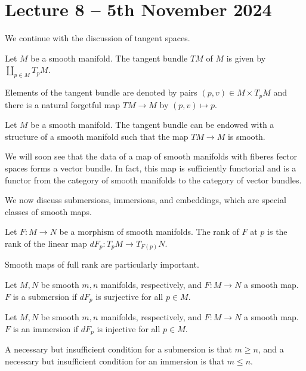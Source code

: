 \section{Lecture 8 -- 5th November 2024}\label{sec: lecture 8}
We continue with the discussion of tangent spaces. 
\begin{definition}\label{def: tangent bundle}
    Let $M$ be a smooth manifold. The tangent bundle $TM$ of $M$ is given by $\coprod_{p\in M}T_{p}M$. 
\end{definition}
\begin{remark}
    Elements of the tangent bundle are denoted by pairs $(p,v)\in M\times T_{p}M$ and there is a natural forgetful map $TM\to M$ by $(p,v)\mapsto p$. 
\end{remark}
\begin{proposition}\label{prop: tangent bundle is smooth manifold}
    Let $M$ be a smooth manifold. The tangent bundle can be endowed with a structure of a smooth manifold such that the map $TM\to M$ is smooth. 
\end{proposition}
\begin{remark}
    We will soon see that the data of a map of smooth manifolds with fiberes fector spaces forms a vector bundle. In fact, this map is sufficiently functorial and is a functor from the category of smooth manifolds to the category of vector bundles. 
\end{remark}
We now discuss submersions, immersions, and embeddings, which are special classes of smooth maps. 
\begin{definition}\label{def: rank of smooth map}
    Let $F:M\to N$ be a morphism of smooth manifolds. The rank of $F$ at $p$ is the rank of the linear map $dF_{p}:T_{p}M\to T_{F(p)}N$. 
\end{definition}
Smooth maps of full rank are particularly important. 
\begin{definition}[Submersion]\label{def: submersion}
    Let $M,N$ be smooth $m,n$ manifolds, respectively, and $F:M\to N$ a smooth map. $F$ is a submersion if $dF_{p}$ is surjective for all $p\in M$. 
\end{definition}
\begin{definition}[Immersion]\label{def: immersion}
    Let $M,N$ be smooth $m,n$ manifolds, respectively, and $F:M\to N$ a smooth map. $F$ is an immersion if $dF_{p}$ is injective for all $p\in M$.
\end{definition}
\begin{remark}
    A necessary but insufficient condition for a submersion is that $m\geq n$, and a necessary but insufficient condition for an immersion is that $m\leq n$.   
\end{remark}
